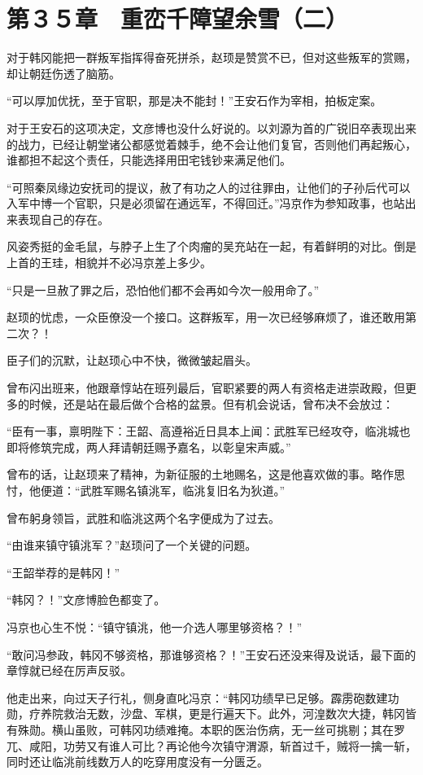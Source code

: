 \section{第３５章　重峦千障望余雪（二）}

对于韩冈能把一群叛军指挥得奋死拼杀，赵顼是赞赏不已，但对这些叛军的赏赐，却让朝廷伤透了脑筋。

“可以厚加优抚，至于官职，那是决不能封！”王安石作为宰相，拍板定案。

对于王安石的这项决定，文彦博也没什么好说的。以刘源为首的广锐旧卒表现出来的战力，已经让朝堂诸公都感觉着棘手，绝不会让他们复官，否则他们再起叛心，谁都担不起这个责任，只能选择用田宅钱钞来满足他们。

“可照秦凤缘边安抚司的提议，赦了有功之人的过往罪由，让他们的子孙后代可以入军中博一个官职，只是必须留在通远军，不得回迁。”冯京作为参知政事，也站出来表现自己的存在。

风姿秀挺的金毛鼠，与脖子上生了个肉瘤的吴充站在一起，有着鲜明的对比。倒是上首的王珪，相貌并不必冯京差上多少。

“只是一旦赦了罪之后，恐怕他们都不会再如今次一般用命了。”

赵顼的忧虑，一众臣僚没一个接口。这群叛军，用一次已经够麻烦了，谁还敢用第二次？！

臣子们的沉默，让赵顼心中不快，微微皱起眉头。

曾布闪出班来，他跟章惇站在班列最后，官职紧要的两人有资格走进崇政殿，但更多的时候，还是站在最后做个合格的盆景。但有机会说话，曾布决不会放过：

“臣有一事，禀明陛下：王韶、高遵裕近日具本上闻：武胜军已经攻夺，临洮城也即将修筑完成，两人拜请朝廷赐予嘉名，以彰皇宋声威。”

曾布的话，让赵顼来了精神，为新征服的土地赐名，这是他喜欢做的事。略作思忖，他便道：“武胜军赐名镇洮军，临洮复旧名为狄道。”

曾布躬身领旨，武胜和临洮这两个名字便成为了过去。

“由谁来镇守镇洮军？”赵顼问了一个关键的问题。

“王韶举荐的是韩冈！”

“韩冈？！”文彦博脸色都变了。

冯京也心生不悦：“镇守镇洮，他一介选人哪里够资格？！”

“敢问冯参政，韩冈不够资格，那谁够资格？！”王安石还没来得及说话，最下面的章惇就已经在厉声反驳。

他走出来，向过天子行礼，侧身直叱冯京：“韩冈功绩早已足够。霹雳砲数建功勋，疗养院救治无数，沙盘、军棋，更是行遍天下。此外，河湟数次大捷，韩冈皆有殊勋。横山虽败，可韩冈功绩难掩。本职的医治伤病，无一丝可挑剔；其在罗兀、咸阳，功劳又有谁人可比？再论他今次镇守渭源，斩首过千，贼将一擒一斩，同时还让临洮前线数万人的吃穿用度没有一分匮乏。

